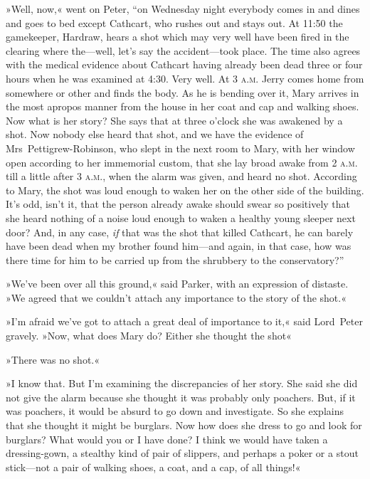 »Well, now,« went on Peter, \enquote{on Wednesday night everybody comes in and dines and goes to bed except Cathcart, who rushes out and stays out. At 11:50 the gamekeeper, Hardraw, hears a shot which may very well have been fired in the clearing where the—well, let's say the accident—took place. The time also agrees with the medical evidence about Cathcart having already been dead three or four hours when he was examined at 4:30. Very well. At 3 \textsc{a.m.} Jerry comes home from somewhere or other and finds the body. As he is bending over it, Mary arrives in the most apropos manner from the house in her coat and cap and walking shoes. Now what is her story? She says that at three o'clock she was awakened by a shot. Now nobody else heard that shot, and we have the evidence of Mrs~Pettigrew-Robinson, who slept in the next room to Mary, with her window open according to her immemorial custom, that she lay broad awake from 2 \textsc{a.m.} till a little after 3 \textsc{a.m.}, when the alarm was given, and heard no shot. According to Mary, the shot was loud enough to waken her on the other side of the building. It's odd, isn't it, that the person already awake should swear so positively that she heard nothing of a noise loud enough to waken a healthy young sleeper next door? And, in any case, \textit{if} that was the shot that killed Cathcart, he can barely have been dead when my brother found him—and again, in that case, how was there time for him to be carried up from the shrubbery to the conservatory?}

»We've been over all this ground,« said Parker, with an expression of distaste. »We agreed that we couldn't attach any importance to the story of the shot.«

»I'm afraid we've got to attach a great deal of importance to it,« said Lord~Peter gravely. »Now, what does Mary do? Either she thought the shot\longdash«

»There was no shot.«

»I know that. But I'm examining the discrepancies of her story. She said she did not give the alarm because she thought it was probably only poachers. But, if it was poachers, it would be absurd to go down and investigate. So she explains that she thought it might be burglars.  Now how does she dress to go and look for burglars? What would you or I have done? I think we would have taken a dressing-gown, a stealthy kind of pair of slippers, and perhaps a poker or a stout stick—not a pair of walking shoes, a coat, and a cap, of all things!«

